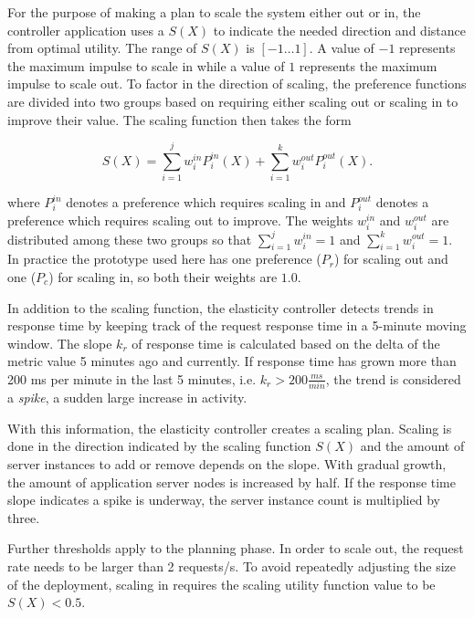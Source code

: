 \documentclass[english]{tktltiki2}
\theoremstyle{definition}
\theoremstyle{remark}
\begin{document}
For the purpose of making a plan to scale the system either out or in, the
controller application uses a  $S(X)$ to indicate the
needed direction and distance from optimal utility. The range of $S(X)$ is
$[-1\dots1]$. A value of $-1$ represents the maximum impulse to scale in while a
value of $1$ represents the maximum impulse to scale out. To factor in the
direction of scaling, the preference functions are divided into two groups based
on requiring either scaling out or scaling in to improve their value.  The
scaling function then takes the form

\begin{equation}
S(X) = \sum\limits_{i=1}^j w_{i}^{in}P_{i}^{in}(X) + 
		\sum\limits_{i=1}^k w_{i}^{out}P_{i}^{out}(X).
\label{eq:scalingfunction}
\end{equation}

where $P_{i}^{in}$ denotes a preference which requires scaling in and
$P_{i}^{out}$ denotes a preference which requires scaling out to improve. The
weights $w_{i}^{in}$ and $w_{i}^{out}$ are distributed among these two groups so
that $\sum\limits_{i=1}^j w_{i}^{in} = 1$ and $\sum\limits_{i=1}^k w_{i}^{out} =
1$. In practice the prototype used here has one preference ($P_{r}$) for scaling out and one ($P_{c}$) for scaling in, so both their weights are $1.0$.

In addition to the scaling function, the elasticity controller detects trends in
response time by keeping track of the request response time in a 5-minute moving
window. The slope $k_{r}$ of response time is calculated based on the delta of
the metric value 5 minutes ago and currently. If response time has grown more
than 200 ms per minute in the last 5 minutes, i.e. $k_{r} > 200 \frac{ms}{min}$,
the trend is considered a \textit{spike}, a sudden large increase in activity.

With this information, the elasticity controller creates a scaling plan. Scaling
is done in the direction indicated by the scaling function $S(X)$ and the amount
of server instances to add or remove depends on the slope. With gradual growth,
the amount of application server nodes is increased by half. If the response
time slope indicates a spike is underway, the server instance count is
multiplied by three. 

Further thresholds apply to the planning phase. In order to scale out, the
request rate needs to be larger than 2 requests/s. To avoid repeatedly adjusting
the size of the deployment, scaling in requires the scaling utility function
value to be $S(X) < 0.5$.
\end{document}
